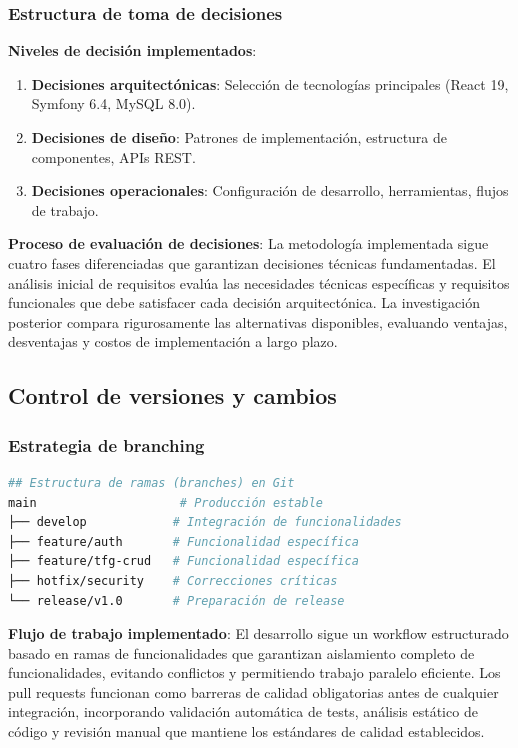 \documentclass[12pt,a4paper,oneside]{report}
\providecommand{\tightlist}{%
  \setlength{\itemsep}{0pt}\setlength{\parskip}{0pt}}
\begin{document}
\subsubsection{Estructura de toma de
decisiones}\label{estructura-de-toma-de-decisiones}

\textbf{Niveles de decisión implementados}:

\begin{enumerate}
\def\labelenumi{\arabic{enumi}.}
\tightlist
\item
  \textbf{Decisiones arquitectónicas}: Selección de tecnologías
  principales (React 19, Symfony 6.4, MySQL 8.0).
\item
  \textbf{Decisiones de diseño}: Patrones de implementación, estructura
  de componentes, APIs REST.
\item
  \textbf{Decisiones operacionales}: Configuración de desarrollo,
  herramientas, flujos de trabajo.
\end{enumerate}

\textbf{Proceso de evaluación de decisiones}: La metodología implementada sigue cuatro fases diferenciadas que garantizan decisiones técnicas fundamentadas. El análisis inicial de requisitos evalúa las necesidades técnicas específicas y requisitos funcionales que debe satisfacer cada decisión arquitectónica. La investigación posterior compara rigurosamente las alternativas disponibles, evaluando ventajas, desventajas y costos de implementación a largo plazo.

\subsection{Control de versiones y
cambios}\label{control-de-versiones-y-cambios}

\subsubsection{Estrategia de branching}\label{estrategia-de-branching}

\begin{lstlisting}[language=bash]
## Estructura de ramas (branches) en Git
main                    # Producción estable
├── develop            # Integración de funcionalidades
├── feature/auth       # Funcionalidad específica
├── feature/tfg-crud   # Funcionalidad específica
├── hotfix/security    # Correcciones críticas
└── release/v1.0       # Preparación de release
\end{lstlisting}

\textbf{Flujo de trabajo implementado}: El desarrollo sigue un workflow estructurado basado en ramas de funcionalidades que garantizan aislamiento completo de funcionalidades, evitando conflictos y permitiendo trabajo paralelo eficiente. Los pull requests funcionan como barreras de calidad obligatorias antes de cualquier integración, incorporando validación automática de tests, análisis estático de código y revisión manual que mantiene los estándares de calidad establecidos.
\end{document}
